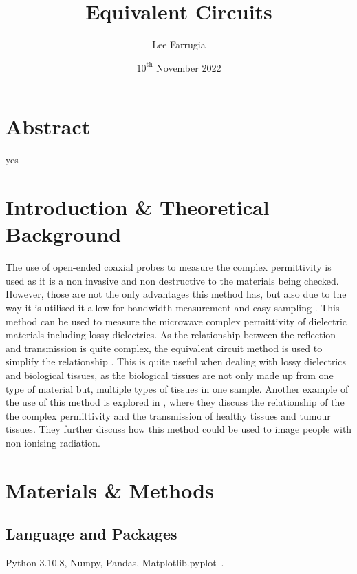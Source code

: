 \documentclass[12pt, a4paper]{article}
\title{Equivalent Circuits}
\date{\(10^\mathrm{{th}}\) November 2022}
\author{Lee Farrugia}
\begin{document}
    
\maketitle
\thispagestyle{titlepagestyle}
\pagestyle{mystyle}

\section{Abstract}
yes

\begin{multicols*}{2}

\section{Introduction \& Theoretical Background}
The use of open-ended coaxial probes to measure the complex permittivity is used as it is a non invasive and non destructive to the materials being checked. However, those are not the only advantages this method has, but also due to the way it is utilised it allow for bandwidth measurement and easy sampling \parencite{liao2011accurate}. This method can be used to measure the microwave complex permittivity of dielectric materials including lossy dielectrics. As the relationship between the reflection and transmission is quite complex, the equivalent circuit method is used to simplify the relationship \parencite{stuchly1982equivalent}. This is quite useful when dealing with lossy dielectrics and biological tissues, as the biological tissues are not only made up from one type of material but, multiple types of tissues in one sample. Another example of the use of this method is explored in \cite{zajivcek2006evaluation}, where they discuss the relationship of the the complex permittivity and the transmission of healthy tissues and tumour tissues. They further discuss how this method could be used to image people with non-ionising radiation.

\section{Materials \& Methods}
\subsection{Language and Packages}
Python 3.10.8, Numpy, Pandas, Matplotlib.pyplot \,.

\end{multicols*}
\end{document}
